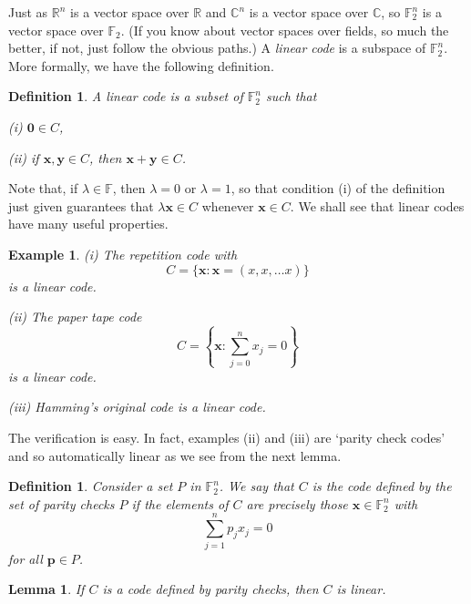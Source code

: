 \documentclass[12pt,a4paper]{article}
\theoremstyle{plain}
\newtheorem{lemma}[theorem]{Lemma}
\newtheorem{definition}[theorem]{Definition}
\newtheorem{example}[theorem]{Example}
\theoremstyle{definition}
\begin{document}
    Just as ${\mathbb R}^{n}$ is a
    vector space over ${\mathbb R}$ and
    ${\mathbb C}^{n}$ is a
    vector space over ${\mathbb C}$, so
    ${\mathbb F}_{2}^{n}$ is a
    vector space over ${\mathbb F}_{2}$.
    (If you know about vector spaces over fields,
    so much the better, if not, just follow
    the obvious paths.)
    A \emph{linear code} is a subspace of ${\mathbb F}_{2}^{n}$.
    More formally, we have the following definition.
    \begin{definition}
        A linear code is a subset of
        ${\mathbb F}_{2}^{n}$ such that

        (i) ${\boldsymbol 0}\in C$,

        (ii) if ${\mathbf x},{\mathbf y}\in C$,
        then ${\mathbf x}+{\mathbf y}\in C$.
    \end{definition}
    Note that, if $\lambda\in{\mathbb F}$, then $\lambda=0$
    or $\lambda=1$, so that condition (i) of the definition
    just given guarantees that $\lambda{\mathbf x}\in C$
    whenever ${\mathbf x}\in C$. We shall see that
    linear codes have many useful properties.

    \begin{example}
        (i) The repetition code with
        \[C=\{{\mathbf x}:{\mathbf x}=(x,x,\dots x)\}\]
        is a linear code.

        (ii)  The paper tape code
        \[C=\left\{{\mathbf x}:\sum_{j=0}^{n}x_{j}=0\right\}\]
        is a linear code.

        (iii) Hamming's original code is a linear code.
    \end{example}
    The verification is easy. In fact,
    examples (ii) and (iii) are `parity check
    codes' and so automatically linear
    as we see from the next lemma.

    \begin{definition}
        Consider a set $P$ in
        ${\mathbb F}_{2}^{n}$. We say that $C$
        is the code defined by the set of
        \emph{parity checks}  $P$ if
        the elements of $C$ are precisely
        those ${\mathbf x}\in{\mathbb F}_{2}^{n}$
        with
        \[\sum_{j=1}^{n}p_{j}x_{j}=0\]
        for all ${\mathbf p}\in P$.
    \end{definition}
    \begin{lemma}
        If $C$ is a code defined
        by parity checks, then $C$ is linear.
    \end{lemma}
\end{document}
